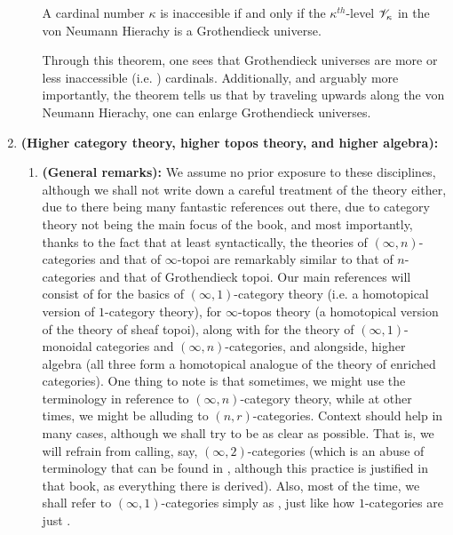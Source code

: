 \begin{enumerate}
\begin{enumerate}
                    \begin{theorem} \label{theorem: universe_enlargement}
                        A cardinal number $\kappa$ is inaccesible if and only if the $\kappa^{th}$-level $\mathscr{V}_{\kappa}$ in the von Neumann Hierachy is a Grothendieck universe. 
                    \end{theorem}
                    \begin{corollary}
                        Through this theorem, one sees that Grothendieck universes are more or less inaccessible (i.e. ) cardinals. Additionally, and arguably more importantly, the theorem tells us that by traveling upwards along the von Neumann Hierachy, one can enlarge Grothendieck universes.
                    \end{corollary}
            \end{enumerate}
        \item \textbf{(Higher category theory, higher topos theory, and higher algebra):} 
            \begin{enumerate}
                \item \textbf{(General remarks):} We assume no prior exposure to these disciplines, although we shall not write down a careful treatment of the theory either, due to there being many fantastic references out there, due to category theory not being the main focus of the book, and most importantly, thanks to the fact that at least syntactically, the theories of $(\infty, n)$-categories and that of $\infty$-topoi are remarkably similar to that of $n$-categories and that of Grothendieck topoi. Our main references will consist of \cite{riehl_from_scratch} for the basics of $(\infty, 1)$-category theory (i.e. a homotopical version of $1$-category theory), \cite{HTT} for $\infty$-topos theory (a homotopical version of the theory of sheaf topoi), along with \cite{HA} for the theory of $(\infty, 1)$-monoidal categories and $(\infty, n)$-categories, and alongside, higher algebra (all three form a homotopical analogue of the theory of enriched categories). One thing to note is that sometimes, we might use the terminology  in reference to $(\infty, n)$-category theory, while at other times, we might be alluding to $(n, r)$-categories. Context should help in many cases, although we shall try to be as clear as possible. That is, we will refrain from calling, say, $(\infty, 2)$-categories  (which is an abuse of terminology that can be found in \cite{GR1}, although this practice is justified in that book, as everything there is derived). Also, most of the time, we shall refer to $(\infty, 1)$-categories simply as , just like how $1$-categories are just .

\end{enumerate}
\end{enumerate}
